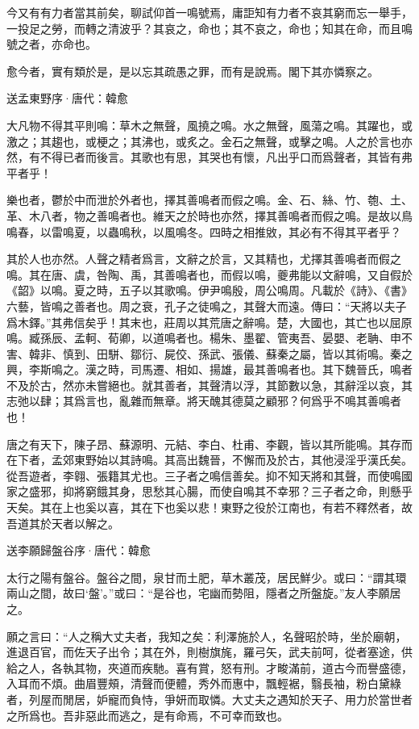 \documentclass[12pt,a4paper]{ctexbook}
\begin{document}
今又有有力者當其前矣，聊試仰首一鳴號焉，庸詎知有力者不哀其窮而忘一舉手，一投足之勞，而轉之清波乎？其哀之，命也；其不哀之，命也；知其在命，而且鳴號之者，亦命也。\par
愈今者，實有類於是，是以忘其疏愚之罪，而有是說焉。閣下其亦憐察之。\par
送孟東野序·唐代：韓愈 \par
大凡物不得其平則鳴：草木之無聲，風撓之鳴。水之無聲，風蕩之鳴。其躍也，或激之；其趨也，或梗之；其沸也，或炙之。金石之無聲，或擊之鳴。人之於言也亦然，有不得已者而後言。其歌也有思，其哭也有懷，凡出乎口而爲聲者，其皆有弗平者乎！\par
樂也者，鬱於中而泄於外者也，擇其善鳴者而假之鳴。金、石、絲、竹、匏、土、革、木八者，物之善鳴者也。維天之於時也亦然，擇其善鳴者而假之鳴。是故以鳥鳴春，以雷鳴夏，以蟲鳴秋，以風鳴冬。四時之相推敓，其必有不得其平者乎？\par
其於人也亦然。人聲之精者爲言，文辭之於言，又其精也，尤擇其善鳴者而假之鳴。其在唐、虞，咎陶、禹，其善鳴者也，而假以鳴，夔弗能以文辭鳴，又自假於《韶》以鳴。夏之時，五子以其歌鳴。伊尹鳴殷，周公鳴周。凡載於《詩》、《書》六藝，皆鳴之善者也。周之衰，孔子之徒鳴之，其聲大而遠。傳曰：“天將以夫子爲木鐸。”其弗信矣乎！其末也，莊周以其荒唐之辭鳴。楚，大國也，其亡也以屈原鳴。臧孫辰、孟軻、荀卿，以道鳴者也。楊朱、墨翟、管夷吾、晏嬰、老聃、申不害、韓非、慎到、田駢、鄒衍、屍佼、孫武、張儀、蘇秦之屬，皆以其術鳴。秦之興，李斯鳴之。漢之時，司馬遷、相如、揚雄，最其善鳴者也。其下魏晉氏，鳴者不及於古，然亦未嘗絕也。就其善者，其聲清以浮，其節數以急，其辭淫以哀，其志弛以肆；其爲言也，亂雜而無章。將天醜其德莫之顧邪？何爲乎不鳴其善鳴者也！\par
唐之有天下，陳子昂、蘇源明、元結、李白、杜甫、李觀，皆以其所能鳴。其存而在下者，孟郊東野始以其詩鳴。其高出魏晉，不懈而及於古，其他浸淫乎漢氏矣。從吾遊者，李翱、張籍其尤也。三子者之鳴信善矣。抑不知天將和其聲，而使鳴國家之盛邪，抑將窮餓其身，思愁其心腸，而使自鳴其不幸邪？三子者之命，則懸乎天矣。其在上也奚以喜，其在下也奚以悲！東野之役於江南也，有若不釋然者，故吾道其於天者以解之。\par
送李願歸盤谷序·唐代：韓愈 \par
太行之陽有盤谷。盤谷之間，泉甘而土肥，草木叢茂，居民鮮少。或曰：“謂其環兩山之間，故曰‘盤’。”或曰：“是谷也，宅幽而勢阻，隱者之所盤旋。”友人李願居之。\par
願之言曰：“人之稱大丈夫者，我知之矣：利澤施於人，名聲昭於時，坐於廟朝，進退百官，而佐天子出令；其在外，則樹旗旄，羅弓矢，武夫前呵，從者塞途，供給之人，各執其物，夾道而疾馳。喜有賞，怒有刑。才畯滿前，道古今而譽盛德，入耳而不煩。曲眉豐頰，清聲而便體，秀外而惠中，飄輕裾，翳長袖，粉白黛綠者，列屋而閒居，妒寵而負恃，爭妍而取憐。大丈夫之遇知於天子、用力於當世者之所爲也。吾非惡此而逃之，是有命焉，不可幸而致也。\par
\end{document}
